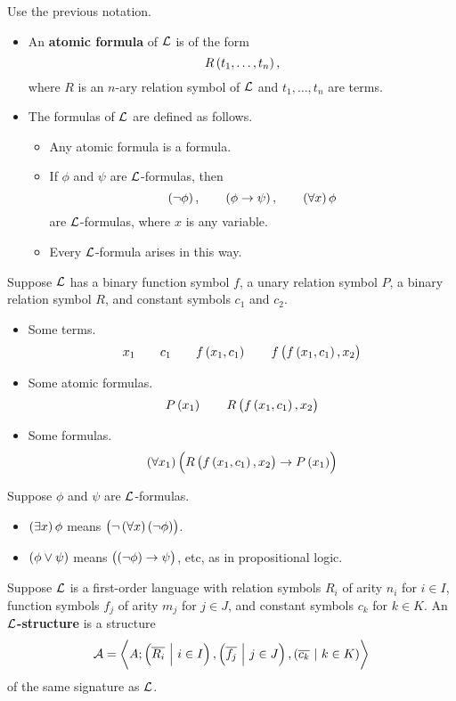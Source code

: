 
\begin{definition}
Use the previous notation.
\begin{itemize}
\item An \textbf{atomic formula} of $ \mathcal{L} $ is of the form
$$ R\br{t_1, \dots, t_n}, $$
where $ R $ is an $ n $-ary relation symbol of $ \mathcal{L} $ and $ t_1, \dots, t_n $ are terms.
\item The formulas of $ \mathcal{L} $ are defined as follows.
\begin{itemize}
\item Any atomic formula is a formula.
\item If $ \phi $ and $ \psi $ are $ \mathcal{L} $-formulas, then
$$ \notb{\phi}, \qquad \impb{\phi}{\psi}, \qquad \fab{x}\phi $$
are $ \mathcal{L} $-formulas, where $ x $ is any variable.
\item Every $ \mathcal{L} $-formula arises in this way.
\end{itemize}
\end{itemize}
\end{definition}

\begin{example*}
Suppose $ \mathcal{L} $ has a binary function symbol $ f $, a unary relation symbol $ P $, a binary relation symbol $ R $, and constant symbols $ c_1 $ and $ c_2 $.
\begin{itemize}
\item Some terms.
$$ x_1 \qquad c_1 \qquad f\br{x_1, c_1} \qquad f\br{f\br{x_1, c_1}, x_2} $$
\item Some atomic formulas.
$$ P\br{x_1} \qquad R\br{f\br{x_1, c_1}, x_2} $$
\item Some formulas.
$$ \fab{x_1}\impb{R\br{f\br{x_1, c_1}, x_2}}{P\br{x_1}} $$
\end{itemize}
\end{example*}

\begin{definition}
Suppose $ \phi $ and $ \psi $ are $ \mathcal{L} $-formulas.
\begin{itemize}
\item $ \teb{x}\phi $ means $ \notb{\fab{x}\notb{\phi}} $.
\item $ \orb{\phi}{\psi} $ means $ \impb{\notb{\phi}}{\psi} $, etc, as in propositional logic.
\end{itemize}
\end{definition}

\begin{definition}
Suppose $ \mathcal{L} $ is a first-order language with relation symbols $ R_i $ of arity $ n_i $ for $ i \in I $, function symbols $ f_j $ of arity $ m_j $ for $ j \in J $, and constant symbols $ c_k $ for $ k \in K $. An \textbf{$ \mathcal{L} $-structure} is a structure
$$ \AAA = \abr{A; \br{\overline{R_i} \st i \in I}, \br{\overline{f_j} \st j \in J}, \br{\overline{c_k} \st k \in K}} $$
of the same signature as $ \mathcal{L} $.
\end{definition}

